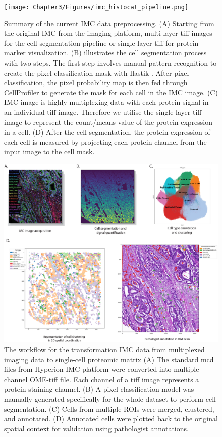\begin{figure}[htp]
    \centering
    \texttt{[image: Chapter3/Figures/imc\_histocat\_pipeline.png]}
    \caption[Illustration of IMC data preprocessing.]{ Summary of the current IMC data preprocessing. (A) Starting from the original IMC from the imaging platform, multi-layer tiff images for the cell segmentation pipeline or single-layer tiff for protein marker visualization. (B) illustrates the cell segmentation process with two steps. The first step involves manual pattern recognition to create the pixel classification mask with Ilastik \cite{berg2019ilastik}. After pixel classification, the pixel probability map is then fed through CellProfiler to generate the mask for each cell in the IMC image. (C) IMC image is highly multiplexing data with each protein signal in an individual tiff image. Therefore we utilise the single-layer tiff image to represent the count/means value of the protein expression in a cell. (D) After the cell segmentation, the protein expression of each cell is measured by projecting each protein channel from the input image to the cell mask.  }
    \label{Chap3:fig:IMC_data_preprocessing}
\end{figure}

\begin{figure}[htp]
    \centering
    \includegraphics[width=\columnwidth]{Chapter3/Figures/Chapter3_Figure2_IMC_cellID_ver2.png}
    \caption[Hyperion Imaging Mass Cytometry cell identification process]{The workflow for the transformation IMC data from multiplexed imaging data to single-cell proteomic matrix (A) The standard mcd files from Hyperion IMC platform were converted into multiple channel OME-tiff file. Each channel of a tiff image represents a protein staining channel. (B) A pixel classification model was manually generated specifically for the whole dataset to perform cell segmentation. (C) Cells from multiple ROIs were merged, clustered, and annotated. (D) Annotated cells were plotted back to the original spatial context for validation using pathologist annotations.}
    \label{Chap3:fig:IMC_cell_type_annotation}
\end{figure}
